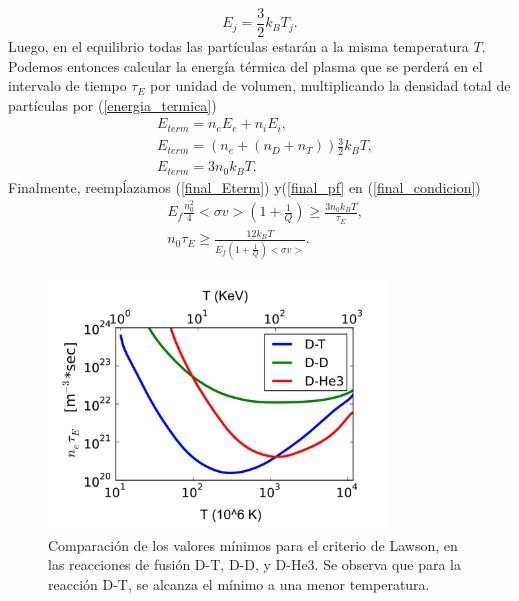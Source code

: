 \documentclass[../main.tex]{subfiles}
\begin{document}
        \begin{equation} \label{energia_termica}
            E_j= \frac{3}{2}k_BT_j.
        \end{equation}
        Luego, en el equilibrio todas las partículas estarán a la misma temperatura $T$. Podemos entonces calcular la energía térmica del plasma que se perderá en el intervalo de tiempo $\tau_E$ por unidad de volumen, multiplicando la densidad total de partículas por (\ref{energia_termica})        \begin{align}
            &E_{term} = n_eE_e + n_iE_i, \\
            &E_{term}= \left( n_e + (n_D + n_T) \right)\frac{3}{2}k_BT, \\
            &E_{term} = 3n_0k_BT. \label{final_Eterm}
        \end{align}
    Finalmente, reempĺazamos (\ref{final_Eterm}) y(\ref{final_pf} en (\ref{final_condicion}) 
        \begin{align}
          &E_f\frac{n_0^2}{4}<\sigma v>\left( 1+\frac{1}{Q} \right) \geq \frac{3n_0k_BT}{\tau_E}, \\
          &n_0\tau_E \geq \frac{12k_BT}{E_f\left( 1+\frac{1}{Q} \right)<\sigma v>}.
        \end{align}
        
        \begin{figure}[h]
        \centering
        \includegraphics[width=0.8\textwidth]{Images/lawson.jpg}
        \caption{Comparación de los valores mínimos para el criterio de Lawson, en las reacciones de fusión D-T, D-D, y D-He3. Se observa que para la reacción D-T, se alcanza el mínimo a una menor temperatura.}
        \end{figure}
        
\end{document}
